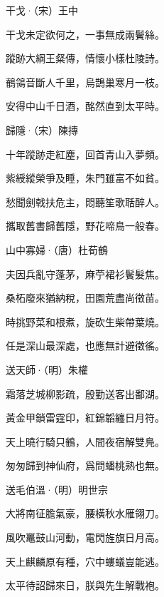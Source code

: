 \documentclass[12pt,a4paper]{ctexbook}
\begin{document}
干戈·（宋）王中\par
干戈未定欲何之，一事無成兩鬢絲。\par
蹤跡大綱王粲傳，情懷小樣杜陵詩。\par
鶺鴒音斷人千里，烏鵲巢寒月一枝。\par
安得中山千日酒，酩然直到太平時。\par
歸隱·（宋）陳摶\par
十年蹤跡走紅塵，回首青山入夢頻。\par
紫綬縱榮爭及睡，朱門雖富不如貧。\par
愁聞劍戟扶危主，悶聽笙歌聒醉人。\par
攜取舊書歸舊隱，野花啼鳥一般春。\par
山中寡婦·（唐）杜荀鶴\par
夫因兵亂守蓬茅，麻苧裙衫鬢髮焦。\par
桑柘廢來猶納稅，田園荒盡尚徵苗。\par
時挑野菜和根煮，旋砍生柴帶葉燒。\par
任是深山最深處，也應無計避徵徭。\par
送天師·（明）朱權\par
霜落芝城柳影疏，殷勤送客出鄱湖。\par
黃金甲鎖雷霆印，紅錦韜纏日月符。\par
天上曉行騎只鶴，人間夜宿解雙鳧。\par
匆匆歸到神仙府，爲問蟠桃熟也無。\par
送毛伯溫·（明）明世宗\par
大將南征膽氣豪，腰橫秋水雁翎刀。\par
風吹鼉鼓山河動，電閃旌旗日月高。\par
天上麒麟原有種，穴中螻蟻豈能逃。\par
太平待詔歸來日，朕與先生解戰袍。\par
\end{document}
